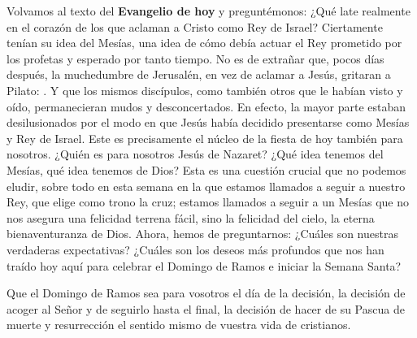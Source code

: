 \begin{body}
Volvamos al texto del \textbf{Evangelio de hoy} y preguntémonos: ¿Qué late realmente en el corazón de los que aclaman a Cristo como Rey de Israel? Ciertamente tenían su idea del Mesías, una idea de cómo debía actuar el Rey prometido por los profetas y esperado por tanto tiempo. No es de extrañar que, pocos días después, la muchedumbre de Jerusalén, en vez de aclamar a Jesús, gritaran a Pilato: . Y que los mismos discípulos, como también otros que le habían visto y oído, permanecieran mudos y desconcertados. En efecto, la mayor parte estaban desilusionados por el modo en que Jesús había decidido presentarse como Mesías y Rey de Israel. Este es precisamente el núcleo de la fiesta de hoy también para nosotros. ¿Quién es para nosotros Jesús de Nazaret? ¿Qué idea tenemos del Mesías, qué idea tenemos de Dios? Esta es una cuestión crucial que no podemos eludir, sobre todo en esta semana en la que estamos llamados a seguir a nuestro Rey, que elige como trono la cruz; estamos llamados a seguir a un Mesías que no nos asegura una felicidad terrena fácil, sino la felicidad del cielo, la eterna bienaventuranza de Dios. Ahora, hemos de preguntarnos: ¿Cuáles son nuestras verdaderas expectativas? ¿Cuáles son los deseos más profundos que nos han traído hoy aquí para celebrar el Domingo de Ramos e iniciar la Semana Santa?

 Que el Domingo de Ramos sea para vosotros el día de la decisión, la decisión de acoger al Señor y de seguirlo hasta el final, la decisión de hacer de su Pascua de muerte y resurrección el sentido mismo de vuestra vida de cristianos. 


\end{body}
